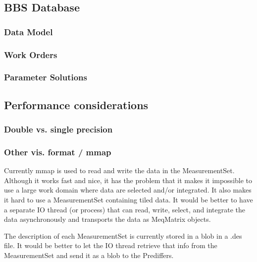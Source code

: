 \documentclass[10pt]{lofar}
\begin{document}
\subsection{BBS Database}
\label{subsec:design-database}

\subsubsection{Data Model}
\label{subsubsec:design-data-model}

\subsubsection{Work Orders}
\label{subsubsec:design-work-orders}

\subsubsection{Parameter Solutions}
\label{subsubsec:design-parmsolutions}

\subsection{Performance considerations}
\label{subsec:performance-considerations}

\subsubsection{Double vs. single precision}
\subsubsection{Other vis. format / mmap}
Currently mmap is used to read and write the data in the MeasurementSet. Although it works fast and nice, it has the problem that it makes it impossible to use a large work domain where data are selected and/or integrated. It also makes it hard to use a MeasurementSet containing tiled data.
It would be better to have a separate IO thread (or process) that can read, write, select, and integrate the data asynchronously and transports the data as MeqMatrix objects.

The description of each MeasurementSet is currently stored in a blob in a .des file. It would be better to let the IO thread retrieve that info from the MeasurementSet and send it as a blob to the Prediffers.
\end{document}
